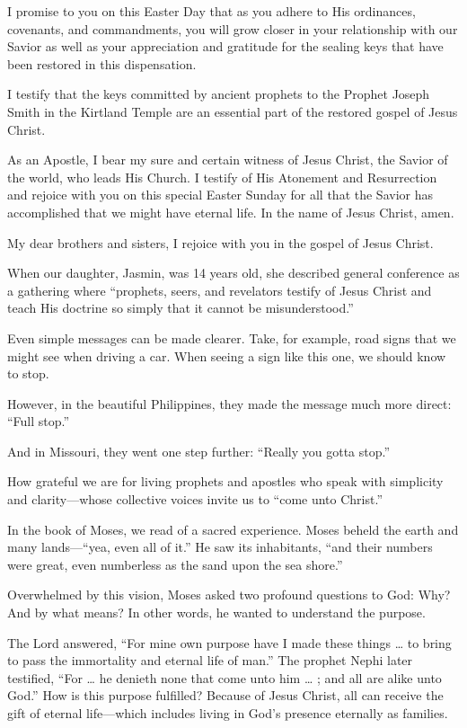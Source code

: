 \documentclass[letterpaper, 11pt]{report}
\newcommand{\speaker}{}
\newcommand{\talk}{}
\newcommand{\talkdatestr}{}
\newcommand{\setspeaker}[1]{\renewcommand{\speaker}{#1}}
\newcommand{\settalk}[1]{\renewcommand{\talk}{#1}}
\newcommand{\talkheading}[2]{%
    \vspace{1em}
    \noindent{\huge\bfseries #1}
    \par\nopagebreak\vspace{0.25em}
    \noindent{\normalsize\bfseries #2\ifx\talkdatestr\empty\else,\ \talkdatestr\fi}
    \par\nopagebreak\vspace{0.5em}
}
\begin{document}
I promise to you on this Easter Day that as you adhere to His ordinances, covenants, and commandments, you will grow closer in your relationship with our Savior as well as your appreciation and gratitude for the sealing keys that have been restored in this dispensation.

I testify that the keys committed by ancient prophets to the Prophet Joseph Smith in the Kirtland Temple are an essential part of the restored gospel of Jesus Christ.

As an Apostle, I bear my sure and certain witness of Jesus Christ, the Savior of the world, who leads His Church. I testify of His Atonement and Resurrection and rejoice with you on this special Easter Sunday for all that the Savior has accomplished that we might have eternal life. In the name of Jesus Christ, amen.

\newpage
\settalk{Come unto Christ—Together}
\setspeaker{Taniela B. Wakolo}
\talkheading{Come unto Christ—Together}{Taniela B. Wakolo}

My dear brothers and sisters, I rejoice with you in the gospel of Jesus Christ.

When our daughter, Jasmin, was 14 years old, she described general conference as a gathering where “prophets, seers, and revelators testify of Jesus Christ and teach His doctrine so simply that it cannot be misunderstood.”

Even simple messages can be made clearer. Take, for example, road signs that we might see when driving a car. When seeing a sign like this one, we should know to stop.

However, in the beautiful Philippines, they made the message much more direct: “Full stop.”

And in Missouri, they went one step further: “Really you gotta stop.”

How grateful we are for living prophets and apostles who speak with simplicity and clarity—whose collective voices invite us to “come unto Christ.”

In the book of Moses, we read of a sacred experience. Moses beheld the earth and many lands—“yea, even all of it.” He saw its inhabitants, “and their numbers were great, even numberless as the sand upon the sea shore.”

Overwhelmed by this vision, Moses asked two profound questions to God: Why? And by what means? In other words, he wanted to understand the purpose.

The Lord answered, “For mine own purpose have I made these things … to bring to pass the immortality and eternal life of man.” The prophet Nephi later testified, “For … he denieth none that come unto him … ; and all are alike unto God.” How is this purpose fulfilled? Because of Jesus Christ, all can receive the gift of eternal life—which includes living in God’s presence eternally as families.
\end{document}
